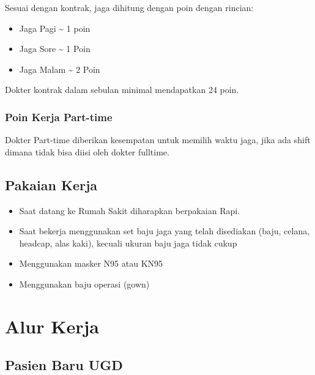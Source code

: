 \documentclass[
]{book}
\providecommand{\tightlist}{%
  \setlength{\itemsep}{0pt}\setlength{\parskip}{0pt}}
\begin{document}
Sesuai dengan kontrak, jaga dihitung dengan poin dengan rincian:

\begin{itemize}
\item
  Jaga Pagi \textasciitilde{} 1 poin
\item
  Jaga Sore \textasciitilde{} 1 Poin
\item
  Jaga Malam \textasciitilde{} 2 Poin
\end{itemize}

Dokter kontrak dalam sebulan minimal mendapatkan 24 poin.

\hypertarget{poin-kerja-part-time}{%
\subsection*{Poin Kerja Part-time}\label{poin-kerja-part-time}}

Dokter Part-time diberikan kesempatan untuk memilih waktu jaga, jika ada shift dimana tidak bisa diisi oleh dokter fulltime.

\hypertarget{pakaian-kerja}{%
\section{Pakaian Kerja}\label{pakaian-kerja}}

\begin{itemize}
\tightlist
\item
  Saat datang ke Rumah Sakit diharapkan berpakaian Rapi.
\item
  Saat bekerja menggunakan set baju jaga yang telah disediakan (baju, celana, headcap, alas kaki), kecuali ukuran baju jaga tidak cukup
\item
  Menggunakan masker N95 atau KN95
\item
  Menggunakan baju operasi (gown)
\end{itemize}

\hypertarget{cross}{%
\chapter{Alur Kerja}\label{cross}}

\hypertarget{pasien-baru-ugd}{%
\section{Pasien Baru UGD}\label{pasien-baru-ugd}}
\end{document}
